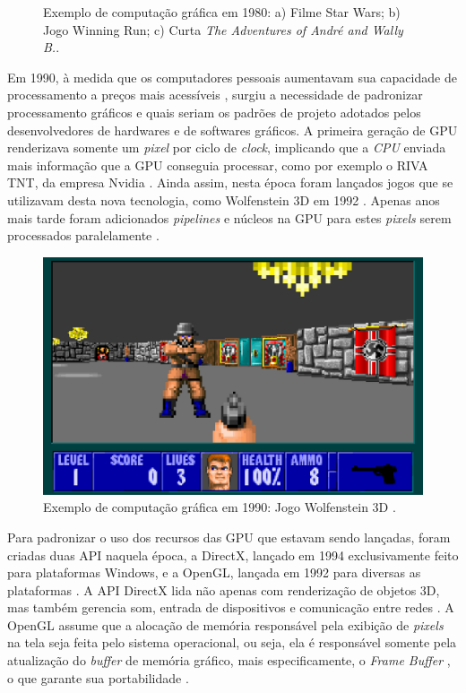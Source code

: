 \begin{savenotes}
\begin{figure}[H]
    \caption{Exemplo de computação gráfica em 1980: a) Filme Star Wars; b) Jogo Winning Run; c) Curta \emph{The Adventures of André and Wally B.}.}

\end{figure}
\end{savenotes}


Em 1990, à medida que os computadores pessoais aumentavam sua capacidade de processamento a preços mais acessíveis \cite{evopc}, surgiu a necessidade de padronizar processamento gráficos e quais seriam os padrões de projeto adotados pelos desenvolvedores de hardwares e de softwares gráficos. A primeira geração de \acrfull{GPU} renderizava somente um \emph{pixel} por ciclo de \emph{clock}, implicando que a \emph{CPU} enviada mais informação que a \acrshort{GPU} conseguia processar, como por exemplo o RIVA TNT, da empresa Nvidia \cite{nvidia}. Ainda assim, nesta época foram lançados jogos que se utilizavam desta nova tecnologia, como Wolfenstein 3D em 1992 \cite{videogamebum}. Apenas anos mais tarde foram adicionados \emph{pipelines} e núcleos na \acrshort{GPU} para estes \emph{pixels} serem processados paralelamente \cite{nvidia}.

 \begin{figure}[H]
    \centering
    \centerline{\includegraphics[width=.5\textwidth]{img/wolfenstein}}
    \caption{Exemplo de computação gráfica em 1990: Jogo Wolfenstein 3D \protect\footnotemark.}
\end{figure}


Para padronizar o uso dos recursos das \acrshort{GPU} que estavam sendo lançadas, foram criadas duas \acrshort{API} naquela época, a DirectX, lançado em 1994 exclusivamente feito para plataformas Windows, e a OpenGL, lançada em 1992 para diversas as plataformas \cite{apigpu}. A \acrshort{API} DirectX lida não apenas com renderização de objetos 3D, mas também gerencia som, entrada de dispositivos e comunicação entre redes \cite{openglgame}. A OpenGL assume que a alocação de memória responsável pela exibição de \emph{pixels} na tela seja feita pelo sistema operacional, ou seja, ela é responsável somente pela atualização do \emph{buffer} de memória gráfico, mais especificamente, o \emph{Frame Buffer} \cite{johnnyartigo}, o que garante sua portabilidade \cite{CG2D}. 

